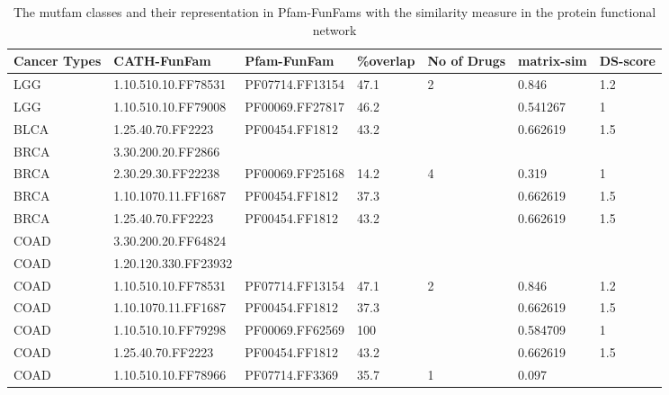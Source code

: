 \documentclass[a4paper, 11pt]{report}
\begin{document}
\begin{table}[!htbp]
\fontsize{9}{10}\selectfont
\centering
\caption{The mutfam classes and their representation in Pfam-FunFams with the  similarity measure in the protein functional network}
\label{mutfam-table}
\begin{tabular}{|l|l|l|l|l|l|l|}
\hline
Cancer Types & CATH-FunFam          & Pfam-FunFam     & \%overlap & No of Drugs & matrix-sim & DS-score \\ \hline
LGG          & 1.10.510.10.FF78531  & PF07714.FF13154 & 47.1      & 2           & 0.846             & 1.2      \\ \hline
LGG          & 1.10.510.10.FF79008  & PF00069.FF27817 & 46.2      &             & 0.541267          & 1        \\ \hline
BLCA         & 1.25.40.70.FF2223    & PF00454.FF1812  & 43.2      &             & 0.662619          & 1.5      \\ \hline
BRCA         & 3.30.200.20.FF2866   &                 &           &             &                   &          \\ \hline
BRCA         & 2.30.29.30.FF22238   & PF00069.FF25168 & 14.2      & 4           & 0.319             & 1        \\ \hline
BRCA         & 1.10.1070.11.FF1687  & PF00454.FF1812  & 37.3      &             & 0.662619          & 1.5      \\ \hline
BRCA         & 1.25.40.70.FF2223    & PF00454.FF1812  & 43.2      &             & 0.662619          & 1.5      \\ \hline
COAD         & 3.30.200.20.FF64824  &                 &           &             &                   &          \\ \hline
COAD         & 1.20.120.330.FF23932 &                 &           &             &                   &          \\ \hline
COAD         & 1.10.510.10.FF78531  & PF07714.FF13154 & 47.1      & 2           & 0.846             & 1.2      \\ \hline
COAD         & 1.10.1070.11.FF1687  & PF00454.FF1812  & 37.3      &             & 0.662619          & 1.5      \\ \hline
COAD         & 1.10.510.10.FF79298  & PF00069.FF62569 & 100       &             & 0.584709          & 1        \\ \hline
COAD         & 1.25.40.70.FF2223    & PF00454.FF1812  & 43.2      &             & 0.662619          & 1.5      \\ \hline
COAD         & 1.10.510.10.FF78966  & PF07714.FF3369  & 35.7      & 1           & 0.097             &          \\ \hline

\end{tabular}
\end{table}
\end{document}
